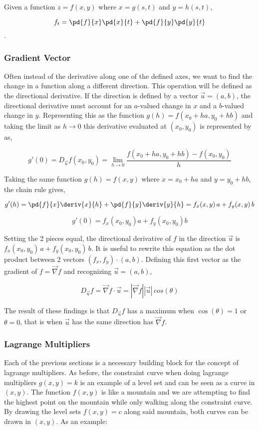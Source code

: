 \documentclass{notes}
\begin{document}
Given a function \(z = f(x, y)\) where \(x = g(s, t)\) and \(y = h(s, t)\), 

\[f_t = \pd{f}{x} \pd{x}{t} + \pd{f}{y} \pd{y}{t}\].

\subsubsection*{Gradient Vector}

Often instead of the derivative along one of the defined axes, we want to find the change in a function along a different direction. This operation will be defined as the directional derivative. If the direction is defined by a vector \(\vec{u} = (a, b)\), the directional derivative must account for an \(a\)-valued change in \(x\) and a \(b\)-valued change in \(y\). Representing this as the function \(g(h) = f(x_0 + ha, y_0 + hb)\) and taking the limit as \(h \to 0\) this derivative evaluated at \((x_0, y_0)\) is represented by as,

\[g'(0) = D_{\vec{u}}f(x_0, y_0) = \lim_{h \to 0}\frac{f(x_0 + ha, y_0 + hb) - f(x_0, y_0)}{h}\]

Taking the same function \(g(h) = f(x, y)\) where \(x = x_0 + ha\) and \(y = y_0 + hb\), the chain rule gives,

\[g'(h) = \pd{f}{x} \deriv{x}{h} + \pd{f}{y} \deriv{y}{h} = f_x(x, y)\,a + f_y(x, y)\,b\]

\[g'(0)= f_x(x_0, y_0)a + f_y(x_0, y_0)b\]

Setting the 2 pieces equal, the directional derivative of \(f\) in the direction \(\vec{u}\) is \(f_x(x_0, y_0)\,a + f_y(x_0, y_0)\,b\). It is useful to rewrite this equation as the dot product between 2 vectors \((f_x, f_y)\cdot (a, b)\). Defining this first vector as the gradient of \(f = \vec{\nabla} f\) and recognizing \(\vec{u} = (a, b)\),

\[D_{\vec{u}}f = \vec{\nabla} f \cdot \vec{u} = |\vec{\nabla} f| |\vec{u}| \,cos(\theta)\]

The result of these findings is that \(D_{\vec{u}}f\) has a maximum when \(\cos(\theta) = 1\) or \(\theta = 0\), that is when \(\vec{u}\) has the same direction has \(\vec{\nabla} f\).

\subsubsection*{Lagrange Multipliers}

Each of the previous sections is a necessary building block for the concept of lagrange multipliers. As before, the constraint curve when doing lagrange multipliers \(g(x, y) = k\) is an example of a level set and can be seen as a curve in \((x, y)\). The function \(f(x, y)\) is like a mountain and we are attempting to find the highest point on the mountain while only walking along the constraint curve. By drawing the level sets \(f(x, y) = c\) along said mountain, both curves can be drawn in \((x, y)\). As an example:
\end{document}
